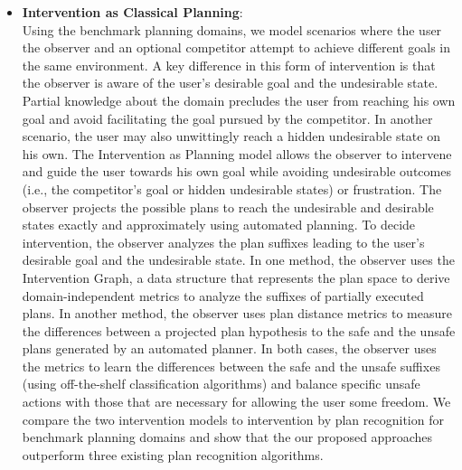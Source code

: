 \begin{itemize}
\item \textbf{Intervention as Classical Planning}: \\
Using the benchmark planning domains, we model scenarios where the user the observer and an optional competitor attempt to achieve different goals in the same environment.
A key difference in this form of intervention is that the observer is aware of  the user's desirable goal and the undesirable state.
Partial knowledge about the domain precludes the user from reaching his own goal and avoid facilitating the goal pursued by the competitor.
In another scenario, the user may also unwittingly reach a hidden undesirable state on his own.
The Intervention as Planning model allows the observer to intervene and guide the user towards his own goal while avoiding undesirable outcomes (i.e., the competitor's goal or hidden undesirable states) or frustration.
The observer projects the possible plans to reach the undesirable and desirable states exactly and approximately using automated planning.
To decide intervention, the observer analyzes the plan suffixes leading to the user's desirable goal and the undesirable state.
In one method, the observer uses the Intervention Graph, a data structure that represents the plan space to derive domain-independent metrics to analyze the suffixes of partially executed plans.
In another method, the observer uses plan distance metrics to measure the differences between a projected plan hypothesis to the safe and the unsafe plans generated by an automated planner.
In both cases, the observer uses the metrics to learn the differences between the safe and the unsafe suffixes (using off-the-shelf classification algorithms) and balance specific unsafe actions with those that are necessary for allowing the user some freedom.
We compare the two intervention models to intervention by plan recognition for benchmark planning domains and show that the our proposed approaches outperform three existing plan recognition algorithms.


\end{itemize}
